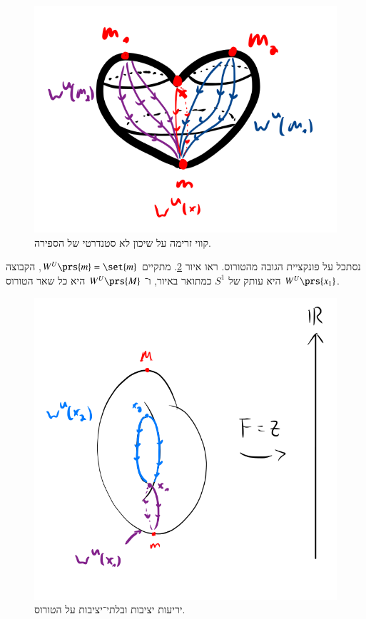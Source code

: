 \documentclass[a4paper,10pt,twoside,openany]{book}
\begin{document}
\begin{figure}
\centering
\includegraphics[scale=0.5]{sources/3.7}
\caption{קווי זרימה על שיכון לא סטנדרטי של הספירה.}
\label{3.7}
\end{figure}

\begin{example}
נסתכל על פונקציית הגובה מהטורוס.
ראו איור
\ref{3.8}.
מתקיים
$W^U\prs{m} = \set{m}$,
הקבוצה
$W^U\prs{x_1}$
היא עותק של
$S^1$
כמתואר באיור, ו־%
$W^U\prs{M}$
היא כל שאר הטורוס.
\end{example}

\begin{figure}
\centering
\includegraphics[scale=0.5]{sources/3.8}
\caption{יריעות יציבות ובלתי־יציבות על הטורוס.}
\label{3.8}
\end{figure}
\end{document}
